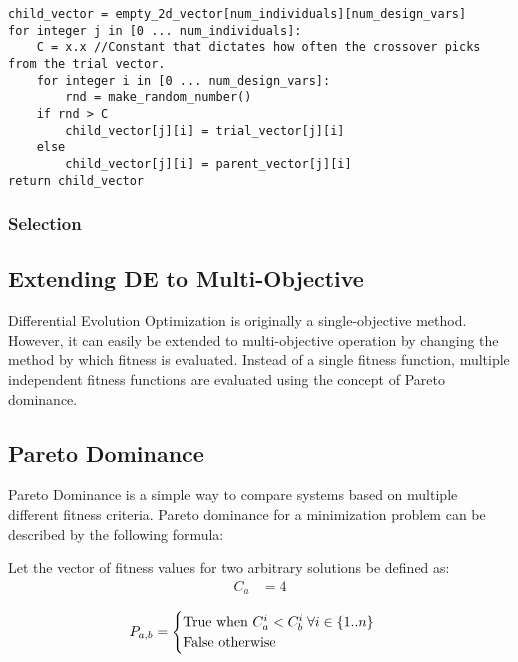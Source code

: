 \begin{lstlisting}[caption=Pseudocode for the Crossover Operator \cite{diff-evol},captionpos=b]
child_vector = empty_2d_vector[num_individuals][num_design_vars]
for integer j in [0 ... num_individuals]:
    C = x.x //Constant that dictates how often the crossover picks from the trial vector. 
    for integer i in [0 ... num_design_vars]:
        rnd = make_random_number()
	if rnd > C
	    child_vector[j][i] = trial_vector[j][i]
	else
	    child_vector[j][i] = parent_vector[j][i]
return child_vector
\end{lstlisting}

\subsubsection{Selection}


\subsection{Extending DE to Multi-Objective}
Differential Evolution Optimization is originally a single-objective method. However, it can easily be extended to multi-objective operation by changing the method by which fitness is evaluated. Instead of a single fitness function, multiple independent fitness functions are evaluated using the concept of Pareto dominance. 


\subsection{Pareto Dominance}
Pareto Dominance is a simple way to compare systems based on multiple different fitness criteria. Pareto dominance for a minimization problem can be described by the following formula: 

Let the vector of fitness values for two arbitrary solutions be defined as:
\begin{align*}
C_a &= 4
\end{align*}

$$
P_{a,b} = \begin{cases}
          \hbox{True  when  } C_{a}^i < C_{b}^i \; \forall i \in \{1..n\}\\ 
          \hbox{False otherwise}
          \end{cases}
$$

